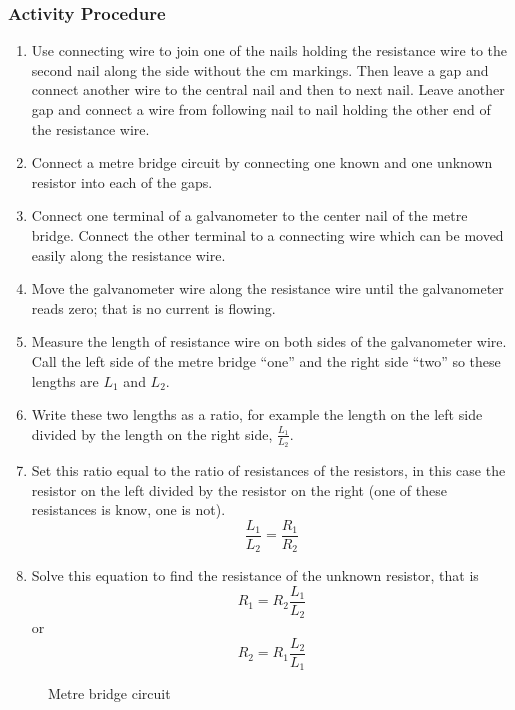 \subsubsection*{Activity Procedure}
\begin{enumerate}
\item{Use connecting wire to join one of the nails holding the resistance wire to the second nail along the side without the cm markings. Then leave a gap and connect another wire to the central nail and then to next nail. Leave another gap and connect a wire from following nail to nail holding the other end of the resistance wire.} 
\item{Connect a metre bridge circuit by connecting one known and one unknown resistor into each of the gaps.} 
\item{Connect one terminal of a galvanometer to the center nail of the metre bridge. Connect the other terminal to a connecting wire which can be moved easily along the resistance wire.} 
\item{Move the galvanometer wire along the resistance wire until the galvanometer reads zero; that is no current is flowing.} 
\item{Measure the length of resistance wire on both sides of the galvanometer wire. Call the left side of the metre bridge ``one'' and the right side ``two'' so these lengths are $L_1$ and $L_2$.} 
\item{Write these two lengths as a ratio, for example the length on the left side divided by the length on the right side, $\frac{L_1}{L_2}$.} 
\item{Set this ratio equal to the ratio of resistances of the resistors, in this case the resistor on the left divided by the resistor on the right (one of these resistances is know, one is not).
$$ \frac{L_1}{L_2} = \frac{R_1}{R_2} $$ 
}
\item{Solve this equation to find the resistance of the unknown resistor, that is $$ R_1 = R_2 \frac{L_1}{L_2} $$ or $$ R_2 = R_1 \frac{L_2}{L_1} $$
} 
\end{enumerate}

\begin{figure}
\begin{center}
\def\svgwidth{300pt}

\caption{Metre bridge circuit}
\label{fig:ohm's-law}
\end{center}
\end{figure}

